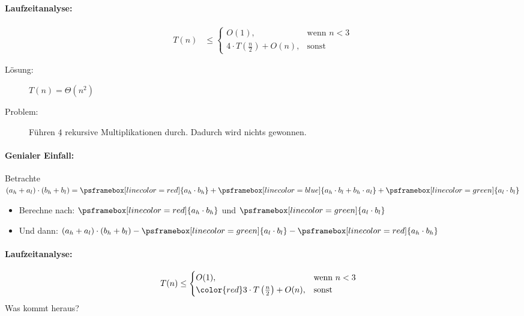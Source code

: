 \begin{itemize}
        \paragraph{Laufzeitanalyse:}
        \begin{align*}
         T(n) &\leq \begin{cases}
                     O(1), & \text{wenn $n < 3$}\\
                     4 \cdot T\left(\frac{n}{2}\right) + O(n), & \text{sonst}
                    \end{cases}
        \end{align*}
        \begin{description}
        \item[Lösung:]  $T(n) = \Theta(n^2)$
        \item[Problem:] Führen $\underline{4}$ rekursive Multiplikationen durch. Dadurch wird nichts gewonnen.
        \end{description}
        \paragraph*{Genialer Einfall:}
        Betrachte $(a_h + a_l) \cdot (b_h + b_l) = \psframebox[linecolor=red]{a_h \cdot b_h} + \psframebox[linecolor=blue]{a_h \cdot b_l + b_h \cdot a_l} + \psframebox[linecolor=green]{a_l \cdot b_l}$
        \begin{itemize}
        \item   Berechne nach: $\psframebox[linecolor=red]{a_h \cdot b_h}$ und $\psframebox[linecolor=green]{a_l \cdot b_l}$
        \item   Und dann: $(a_h + a_l) \cdot (b_h + b_l) - \psframebox[linecolor=green]{a_l \cdot b_l} - \psframebox[linecolor=red]{a_h \cdot b_h}$
        \end{itemize}
        \paragraph*{Laufzeitanalyse:}
        \begin{align*}
         T(n) &\leq \begin{cases}
                     O(1), & \text{wenn $n < 3$}\\
                     {\color{red}3} \cdot T\left(\frac{n}{2}\right) + O(n), & \text{sonst}
                    \end{cases}
        \end{align*}
        Was kommt heraus?
\end{itemize}

